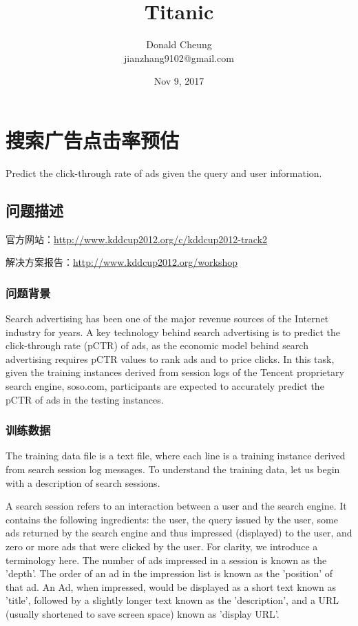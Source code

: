 \documentclass[10pt,a4paper]{ctexbook}
\begin{document}
    \setlength{\baselineskip}{20pt}
    \title{Titanic}
    \author{Donald Cheung\\jianzhang9102@gmail.com}
    \date{Nov 9, 2017}
    \tableofcontents
\fi

\chapter{搜索广告点击率预估}
Predict the click-through rate of ads given the query and user information.

\section{问题描述}
官方网站：\url{http://www.kddcup2012.org/c/kddcup2012-track2}

解决方案报告：\url{http://www.kddcup2012.org/workshop}

\subsection{问题背景}
Search advertising has been one of the major revenue sources of the Internet industry for years. A key technology behind search advertising is to predict the click-through rate (pCTR) of ads, as the economic model behind search advertising requires pCTR values to rank ads and to price clicks. In this task, given the training instances derived from session logs of the Tencent proprietary search engine, soso.com, participants are expected to accurately predict the pCTR of ads in the testing instances.

\subsection{训练数据}
The training data file is a text file, where each line is a training instance derived from search session log messages. To understand the training data, let us begin with a description of search sessions.   

A search session refers to an interaction between a user and the search engine. It contains the following ingredients: the user, the query issued by the user, some ads returned by the search engine and thus impressed (displayed) to the user, and zero or more ads that were clicked by the user. For clarity, we introduce a terminology here. The number of ads impressed in a session is known as the 'depth'. The order of an ad in the impression list is known as the 'position' of that ad. An Ad, when impressed, would be displayed as a short text known as 'title', followed by a slightly longer text known as the 'description', and a URL (usually shortened to save screen space) known as 'display URL'.   
\end{document}
